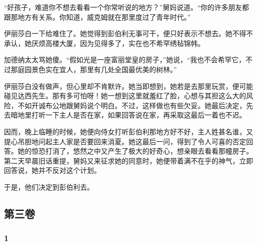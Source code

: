 \par “好孩子，难道你不想去看看一个你常听说的地方？”舅妈说道。“你的许多朋友都跟那地方有关系。你知道，威克姆就在那里度过了青年时代。”
\par 伊丽莎白一下给难住了。她觉得到彭伯利无事可干，便只好表示不想去。她不得不承认，她厌烦高楼大厦，因为见得多了，实在也不希罕绣毡锦帏。
\par 加德纳太太骂她傻。“假如光是一座富丽堂皇的房子，”她说，“我也不会希罕它，不过那庭园景色实在宜人，那里有几处全国最优美的树林。”
\par 伊丽莎白没有做声，但心里却不肯默许。她当即想到，她若是去那里玩赏，便可能碰见达西先生。那有多可怕呀！她一想到这里就羞红了脸，心想与其担这么大的风险，不如开诚布公地跟舅妈说个明白。不过，这样做也有些欠妥。她最后决定，先去暗地里打听一下主人是否在家，如果回答说在家，再采取这最后一着也不迟。
\par 因而，晚上临睡的时候，她便向侍女打听彭伯利那地方好不好，主人姓甚名谁，又提心吊胆地问起主人家是否要回来消夏。她这最后一问，得到了令人可喜的否定回答。她的惊恐打消了，悠然之中又产生了极大的好奇心，想亲眼去看看那幢房子。第二天早晨旧话重提，舅妈又来征求她的同意时，她便带着满不在乎的神气，立即回答说，她并不反对这个计划。
\par 于是，他们决定到彭伯利去。







\subsection*{第三卷}




\subsubsection*{1}


